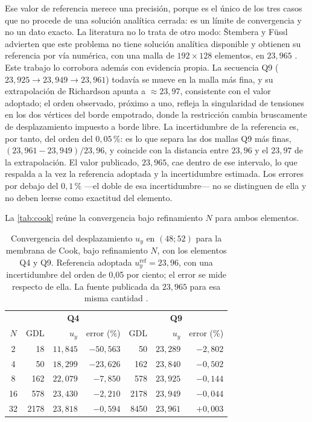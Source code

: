 Ese valor de referencia merece una precisión, porque es el único de los tres casos que no procede de una solución analítica cerrada: es un límite de convergencia y no un dato exacto. La literatura no lo trata de otro modo: Štembera y Füssl advierten que este problema no tiene solución analítica disponible y obtienen su referencia por vía numérica, con una malla de $192\times128$ elementos, en $23{,}965$ \autocite[p.~28]{stembera2019dkmq24}. Este trabajo lo corrobora además con evidencia propia. La secuencia Q9 ($23{,}925 \to 23{,}949 \to 23{,}961$) todavía se mueve en la malla más fina, y su extrapolación de Richardson \autocite[pp.~309-312]{oberkampf2010vv} apunta a $\approx 23{,}97$, consistente con el valor adoptado; el orden observado, próximo a uno, refleja la singularidad de tensiones en los dos vértices del borde empotrado, donde la restricción cambia bruscamente de desplazamiento impuesto a borde libre. La incertidumbre de la referencia es, por tanto, del orden del $0{,}05\,\%$: es lo que separa las dos mallas Q9 más finas, $(23{,}961-23{,}949)/23{,}96$, y coincide con la distancia entre $23{,}96$ y el $23{,}97$ de la extrapolación. El valor publicado, $23{,}965$, cae dentro de ese intervalo, lo que respalda a la vez la referencia adoptada y la incertidumbre estimada. Los errores por debajo del $0{,}1\,\%$ ---el doble de esa incertidumbre--- no se distinguen de ella y no deben leerse como exactitud del elemento.

La \autoref{tab:cook} reúne la convergencia bajo refinamiento $N$ para ambos elementos.

\begin{table}[htbp]
\centering
\caption[Convergencia del desplazamiento $u_y$ en $(48;52)$ para la membrana de Cook.]{Convergencia del desplazamiento $u_y$ en $(48;52)$ para la membrana de Cook, bajo refinamiento $N$, con los elementos Q4 y Q9. Referencia adoptada $u_y^{\text{ref}} = 23{,}96$, con una incertidumbre del orden de 0,05 por ciento; el error se mide respecto de ella. La fuente publicada da $23{,}965$ para esa misma cantidad \autocite[p.~28]{stembera2019dkmq24}.}
\label{tab:cook}
\begin{tabular}{c r r r r r r}
\hline
 & \multicolumn{3}{c}{\textbf{Q4}} & \multicolumn{3}{c}{\textbf{Q9}} \\
$N$ & GDL & $u_y$ & error (\%) & GDL & $u_y$ & error (\%) \\
\hline
2  & 18   & $11{,}845$ & $-50{,}563$ & 50   & $23{,}289$ & $-2{,}802$ \\
4  & 50   & $18{,}299$ & $-23{,}626$ & 162  & $23{,}840$ & $-0{,}502$ \\
8  & 162  & $22{,}079$ & $-7{,}850$  & 578  & $23{,}925$ & $-0{,}144$ \\
16 & 578  & $23{,}430$ & $-2{,}210$  & 2178 & $23{,}949$ & $-0{,}044$ \\
32 & 2178 & $23{,}818$ & $-0{,}594$  & 8450 & $23{,}961$ & $+0{,}003$ \\
\hline
\end{tabular}
\end{table}

